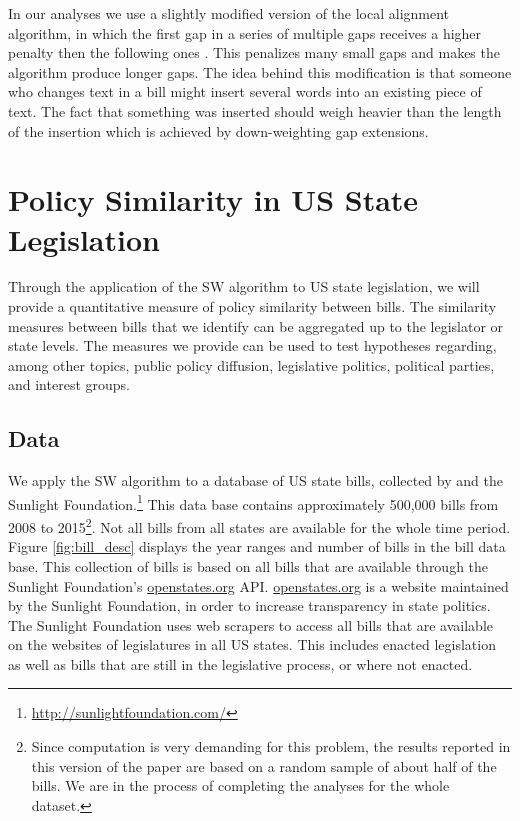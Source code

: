 \documentclass[12pt]{article} %
\begin{document}
In our analyses we use a slightly modified version of the local alignment algorithm, in which the first gap in a series of multiple gaps receives a higher penalty then the following ones \citep[][use the same modification]{wilkerson2015tracing}. This penalizes many small gaps and makes the algorithm produce longer gaps. The idea behind this modification is that someone who changes text in a bill might insert several words into an existing piece of text. The fact that something was inserted should weigh heavier than the length of the insertion which is achieved by down-weighting gap extensions. 




\section{Policy Similarity in US State Legislation}
Through the application of the SW algorithm to US state legislation, we will
provide a quantitative measure of policy similarity between bills. The
similarity measures between bills  that we identify can be aggregated up to the legislator or state levels. The measures we provide can be used to test hypotheses regarding, among other topics, public policy diffusion, legislative politics, political parties, and interest groups.  

\subsection{Data}
We apply the SW algorithm to a database of US state bills, collected by
\citet{burgess2016legislative} and the Sunlight
Foundation.\footnote{\url{http://sunlightfoundation.com/}} This data base
contains approximately 500,000 bills from 2008 to 2015\footnote{Since
    computation is very demanding for this problem, the results reported in this
    version of the paper are based on a random sample of about half of the
    bills. We are in the process of completing the analyses for the whole
dataset.}. Not all bills from all
states are available for the whole time period. Figure \ref{fig:bill_desc}
displays the year ranges and number of bills in the bill data base. This
collection of bills is based on all bills that are available through the
Sunlight Foundation's \url{openstates.org} API. \url{openstates.org} is a website maintained by the Sunlight Foundation, in order to increase transparency in state politics. The Sunlight Foundation uses web scrapers to access all bills that are available on the websites of legislatures in all US states. This includes enacted legislation as well as bills that are still in the legislative process, or where not enacted. %
\end{document}
